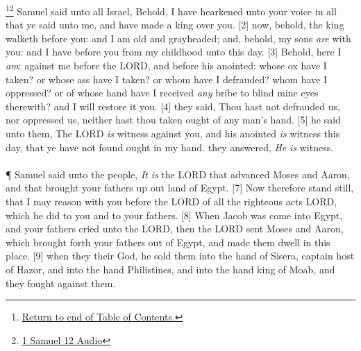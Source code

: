 \footnote{\textcolor[cmyk]{0.99998,1,0,0}{\hyperlink{TOC}{Return to end of Table of Contents.}}}\footnote{\href{https://audiobible.com/bible/1_samuel_12.html}{\textcolor[cmyk]{0.99998,1,0,0}{1 Samuel 12 Audio}}}\textcolor[cmyk]{0.99998,1,0,0}{ Samuel said unto all Israel, Behold, I have hearkened unto your voice in all that ye said unto me, and have made a king over you.}
[2] \textcolor[cmyk]{0.99998,1,0,0}{ now, behold, the king walketh before you: and I am old and grayheaded; and, behold, my sons \emph{are} with you: and I have  before you from my childhood unto this day.}
[3] \textcolor[cmyk]{0.99998,1,0,0}{Behold, here I \emph{am}:  against me before the LORD, and before his anointed: whose ox have I taken? or whose ass have I taken? or whom have I defrauded? whom have I oppressed? or of whose hand have I received \emph{any} bribe to blind mine eyes therewith? and I will restore it you.}
[4] \textcolor[cmyk]{0.99998,1,0,0}{ they said, Thou hast not defrauded us, nor oppressed us, neither hast thou taken ought of any man's hand.}
[5] \textcolor[cmyk]{0.99998,1,0,0}{ he said unto them, The LORD \emph{is} witness against you, and his anointed \emph{is} witness this day, that ye have not found ought in my hand.  they answered, \emph{He} \emph{is} witness.}\\
\\
\P \textcolor[cmyk]{0.99998,1,0,0}{ Samuel said unto the people, \emph{It} \emph{is} the LORD that advanced Moses and Aaron, and that brought your fathers up out  land of Egypt.}
[7] \textcolor[cmyk]{0.99998,1,0,0}{Now therefore stand still, that I may reason with you before the LORD of all the righteous acts  LORD, which he did to you and to your fathers.}
[8] \textcolor[cmyk]{0.99998,1,0,0}{When Jacob was come into Egypt, and your fathers cried unto the LORD, then the LORD sent Moses and Aaron, which brought forth your fathers out of Egypt, and made them dwell in this place.}
[9] \textcolor[cmyk]{0.99998,1,0,0}{ when they  their God, he sold them into the hand of Sisera, captain  host of Hazor, and into the hand  Philistines, and into the hand  king of Moab, and they fought against them.}
